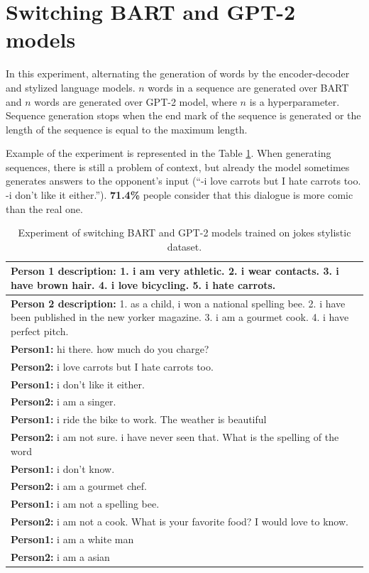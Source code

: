 \section{Switching BART and GPT-2 models}
In this experiment, alternating the generation of words by the encoder-decoder and stylized language models. $n$ words in a sequence are generated over BART and $n$ words are generated over GPT-2 model, where $n$ is a hyperparameter. Sequence generation stops when the end mark of the sequence is generated or the length of the sequence is equal to the maximum length.

Example of the experiment is represented in the Table \ref{tab:jokes_switch}. When generating sequences, there is still a problem of context, but already the model sometimes generates answers to the opponent's input (``-i love carrots but I hate carrots too. -i don't like it either.''). \textbf{71.4\%} people consider that this dialogue is more comic than the real one.

\begin{table}[H]
\centering
 \begin{tabular}{|p{14cm}|} 
 \hline
 \textbf{Person 1 description:} 1. i am very athletic. 2. i wear contacts. 3. i have brown hair. 4. i love bicycling. 5. i hate carrots. \\
 \hline
 \textbf{Person 2 description:} 1. as a child, i won a national spelling bee. 2. i have been published in the new yorker magazine. 3. i am a gourmet cook. 4. i have perfect pitch. \\
 \hline
 \textbf{Person1:} hi there. how much do you charge?  \\
 \textbf{Person2:} i love carrots but I hate carrots too.  \\ 
 \textbf{Person1:} i don't like it either. \\
 \textbf{Person2:} i am a singer.\\
 \textbf{Person1:} i ride the bike to work. The weather is beautiful  \\
 \textbf{Person2:} i am not sure. i have never seen that. What is the spelling of the word   \\
 \textbf{Person1:} i don't know. \\
 \textbf{Person2:} i am a gourmet chef. \\
 \textbf{Person1:} i am not a spelling bee. \\
 \textbf{Person2:} i am not a cook. What is your favorite food? I would love to know. \\
 \textbf{Person1:} i am a white man \\
 \textbf{Person2:} i am a asian \\
 \hline
 \end{tabular}
 \caption{Experiment of switching BART and GPT-2 models trained on jokes stylistic dataset.}
\label{tab:jokes_switch}
\end{table}

